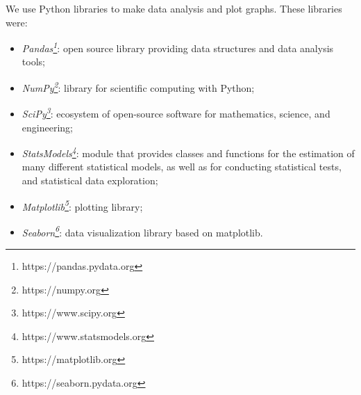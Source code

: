 We use Python libraries to make data analysis and plot graphs. These libraries were:
\begin{itemize}
    \item \textit{Pandas\footnote{https://pandas.pydata.org}}: open source library providing data structures and data analysis tools;
    \item \textit{NumPy\footnote{https://numpy.org}}: library for scientific computing with Python;
    \item \textit{SciPy\footnote{https://www.scipy.org}}: ecosystem of open-source software for mathematics, science, and engineering;
    \item \textit{StatsModels\footnote{https://www.statsmodels.org}}: module that provides classes and functions for the estimation of many different statistical models, as well as for conducting statistical tests, and statistical data exploration;
    \item \textit{Matplotlib\footnote{https://matplotlib.org}}: plotting library;
    \item \textit{Seaborn\footnote{https://seaborn.pydata.org}}: data visualization library based on matplotlib.
\end{itemize}